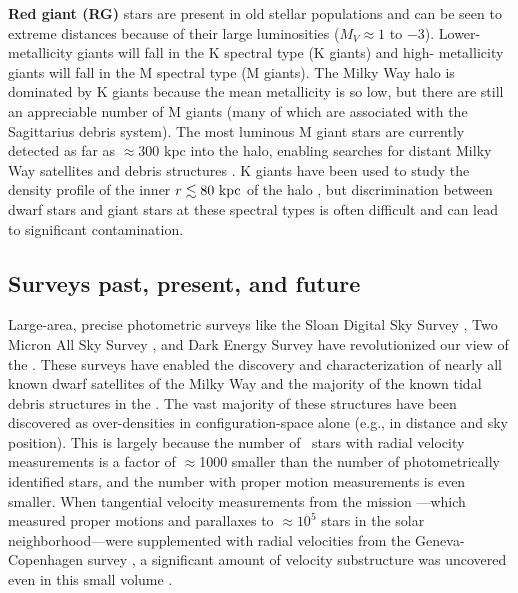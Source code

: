 {\bf Red giant (RG)} stars are present in old stellar populations and can be
seen to extreme distances because of their large luminosities ($M_V \approx 1$
to $-3$). Lower-metallicity giants will fall in the K spectral type (K giants)
and high- metallicity giants will fall in the M spectral type (M giants). The
Milky Way halo is dominated by K giants because the mean metallicity is so low,
but there are still an appreciable number of M giants (many of which are
associated with the Sagittarius debris system). The most luminous M giant stars
are currently detected as far as $\approx$300 kpc into the halo, enabling
searches for distant Milky Way satellites and debris structures
\citep{bochanski14}. K giants have been used to study the density profile of the
inner $r \lesssim 80~\mathrm{kpc}$ of the halo \citep{xue15}, but discrimination between
dwarf stars and giant stars at these spectral types is often difficult and can
lead to significant contamination.

\subsection{Surveys past, present, and future}

Large-area, precise photometric surveys like the Sloan Digital Sky Survey
\citep[SDSS;][]{york00}, Two Micron All Sky Survey
\citep[2MASS;][]{skrutskie06}, and Dark Energy Survey \citep[DES;][]{flaugher12}
have revolutionized our view of the \mwhalo. These surveys have enabled the
discovery and characterization of nearly all known dwarf satellites of the Milky
Way and the majority of the known tidal debris structures in the \mwhalo. The
vast majority of these structures have been discovered as over-densities in
configuration-space alone (e.g., in distance and sky position). This is largely
because the number of \mwhalo\ stars with radial velocity measurements is a
factor of $\approx$1000 smaller than the number of photometrically identified
stars, and the number with proper motion measurements is even smaller. When
tangential velocity measurements from the  mission
\citep{perryman97}---which measured proper motions and parallaxes to
$\approx$$10^5$ stars in the solar neighborhood---were supplemented with radial
velocities from the Geneva-Copenhagen survey \citep{nordstrom04}, a significant
amount of velocity substructure was uncovered even in this small volume
\citep[e.g.,][]{bovy09, minchev10}.

